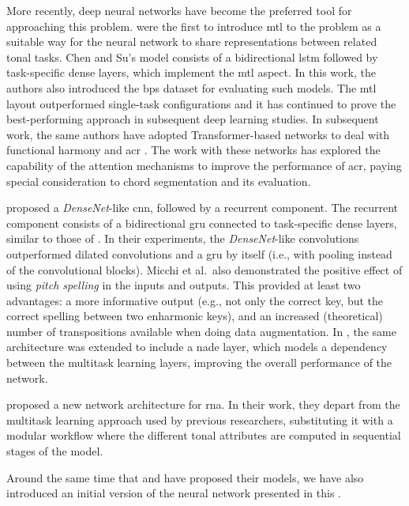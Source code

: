 More recently, deep neural networks have become the
preferred tool for approaching this problem.
\textcite{chen2018functional} were the first to introduce
\gls{mtl} \parencite{ruder2017overview} to the problem as a
suitable way for the neural network to share representations
between related tonal tasks. Chen and Su's model consists of
a bidirectional \gls{lstm} \parencite{hochreiter1997long}
followed by task-specific dense layers, which implement the
\gls{mtl} aspect. In this work, the authors also introduced
the \gls{bps} dataset for evaluating such models. The
\gls{mtl} layout outperformed single-task configurations and
it has continued to prove the best-performing approach in
subsequent deep learning studies. In subsequent work, the
same authors have adopted Transformer-based networks to deal
with functional harmony and \gls{acr}
\parencite{chen2019harmony, chen2021attend}. The work with
these networks has explored the capability of the attention
mechanisms to improve the performance of \gls{acr}, paying
special consideration to chord segmentation and its
evaluation.

\textcite{micchi2020not} proposed a \emph{DenseNet}-like
\parencite{huang2017densely} \gls{cnn}, followed by a
recurrent component. The recurrent component consists of a
bidirectional \gls{gru} \parencite{cho2014learning}
connected to task-specific dense layers, similar to those of
\textcite{chen2018functional}. In their experiments, the
\emph{DenseNet}-like convolutions outperformed dilated
convolutions and a \gls{gru} by itself (i.e., with pooling
instead of the convolutional blocks). Micchi et al.~also
demonstrated the positive effect of using \emph{pitch
spelling} in the inputs and outputs. This provided at least
two advantages: a more informative output (e.g., not only
the correct key, but the correct spelling between two
enharmonic keys), and an increased (theoretical) number of
transpositions available when doing data augmentation. In
\textcite{micchi2021deep}, the same architecture was
extended to include a \gls{nade} layer, which models a
dependency between the multitask learning layers, improving
the overall performance of the network.

\textcite{mcleod2021modular} proposed a new network
architecture for \gls{rna}. In their work, they depart from
the multitask learning approach used by previous
researchers, substituting it with a modular workflow where
the different tonal attributes are computed in sequential
stages of the model.

Around the same time that \textcite{micchi2021deep} and
\textcite{mcleod2021modular} have proposed their models, we
have also introduced an initial version of the neural
network presented in this \thesisdiss{}
\parencite{napoleslopez2021augmentednet}.
